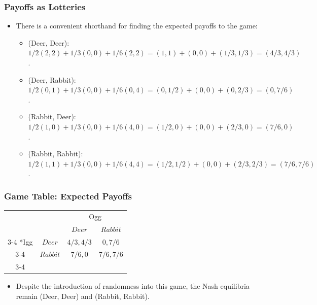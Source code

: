 
\begin{frame}
\frametitle{Payoffs as Lotteries}
\begin{itemize}
\item There is a convenient shorthand for finding the expected payoffs to the game:
\begin{itemize}
\item (Deer, Deer): $1/2(2, 2) + 1/3(0, 0) + 1/6(2, 2) = (1, 1) + (0, 0) + (1/3, 1/3) = (4/3, 4/3)$.
\item (Deer, Rabbit): $1/2(0, 1) + 1/3(0, 0) + 1/6(0, 4) = (0, 1/2) + (0, 0) + (0, 2/3) = (0, 7/6)$.
\item (Rabbit, Deer): $1/2(1, 0) + 1/3(0, 0) + 1/6(4, 0) = (1/2, 0) + (0, 0) + (2/3, 0) = (7/6, 0)$.
\item (Rabbit, Rabbit): $1/2(1, 1) + 1/3(0, 0) + 1/6(4, 4) = (1/2, 1/2) + (0, 0) + (2/3, 2/3) = (7/6, 7/6)$.
\end{itemize}
\end{itemize}
\end{frame}


\begin{frame}
\frametitle{Game Table: Expected Payoffs}
\begin{table}[h]
	\centering
	\begin{tabular}{cc|c|c|}
		& \multicolumn{1}{c}{} & \multicolumn{2}{c}{Ogg}\\
		& \multicolumn{1}{c}{} & \multicolumn{1}{c}{$Deer$}  & \multicolumn{1}{c}{$Rabbit$} \\\cline{3-4}
		\multirow{2}*{Igg}  & $Deer$ & $4/3, 4/3$ & $0, 7/6$ \\\cline{3-4}
		& $Rabbit$ & $7/6, 0$ & $7/6, 7/6$ \\\cline{3-4}
	\end{tabular}
\end{table}
\begin{itemize}
\item Despite the introduction of randomness into this game, the Nash equilibria remain (Deer, Deer) and (Rabbit, Rabbit).
\end{itemize}
\end{frame}


